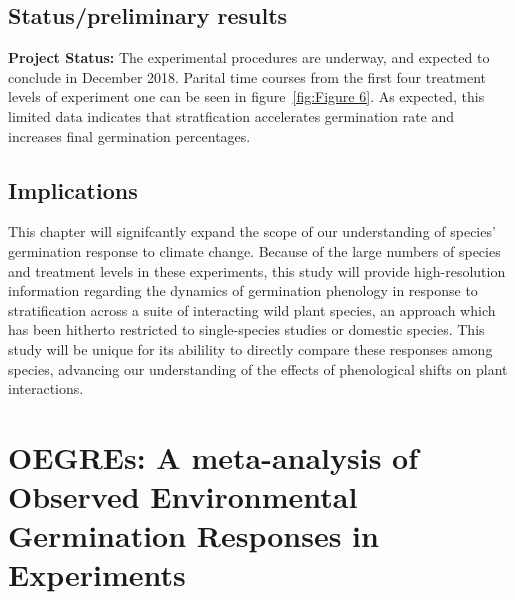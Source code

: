 \documentclass[12pt]{article}\usepackage[]{graphicx}\usepackage[]{color}
\begin{document}
\subsection*{Status/preliminary results}
\textbf{Project Status:} The experimental procedures are underway, and expected to conclude in December 2018. Parital time courses from the first four treatment levels of experiment one can be seen in figure~\ref{fig:Figure 6}. As expected, this limited data indicates that stratfication accelerates germination rate and increases final germination percentages.\\
\subsection*{Implications}
\indent\indent This chapter will signifcantly expand the scope of our understanding of species' germination response to climate change. Because of the large numbers of species and treatment levels in these experiments, this study will provide high-resolution information regarding the dynamics of germination phenology in response to stratification across a suite of interacting wild plant species, an approach which has been hitherto restricted to single-species studies or domestic species. This study will be unique for its abilility to directly compare these responses among species, advancing our understanding of the effects of phenological shifts on plant interactions.
\section*{OEGREs: A meta-analysis of Observed Environmental Germination Responses in Experiments}
\end{document}
